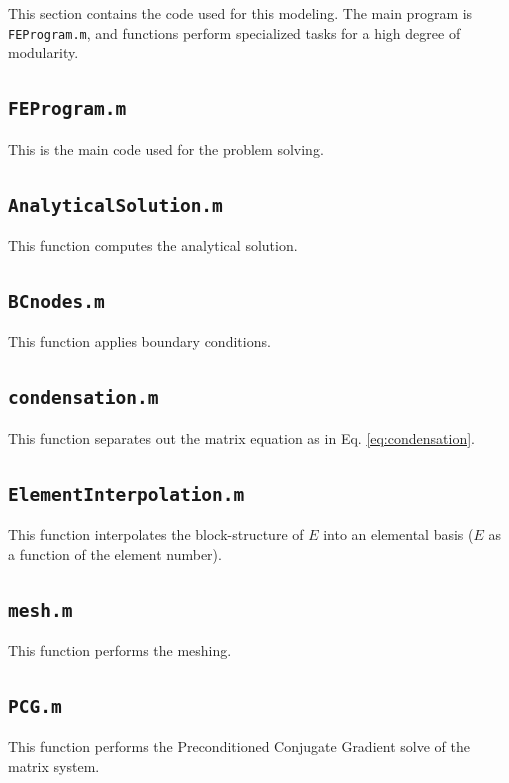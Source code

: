 \documentclass[10pt]{article}
\begin{document}
This section contains the code used for this modeling. The main program is \texttt{FEProgram.m}, and functions perform specialized tasks for a high degree of modularity.

\subsection{\texttt{FEProgram.m}}
This is the main code used for the problem solving.


\subsection{\texttt{AnalyticalSolution.m}}
This function computes the analytical solution.


\subsection{\texttt{BCnodes.m}}
This function applies boundary conditions.


\subsection{\texttt{condensation.m}}
This function separates out the matrix equation as in Eq. \eqref{eq:condensation}.


\subsection{\texttt{ElementInterpolation.m}}
This function interpolates the block-structure of \(E\) into an elemental basis (\(E\) as a function of the element number).


\subsection{\texttt{mesh.m}}
This function performs the meshing.


\subsection{\texttt{PCG.m}}
This function performs the Preconditioned Conjugate Gradient solve of the matrix system.

\end{document}
